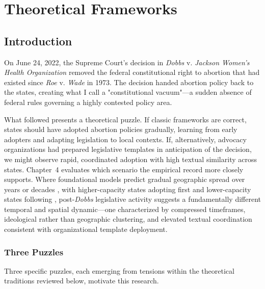 
\chapter{Theoretical Frameworks}
\label{ch:theory}

\section{Introduction}

On June 24, 2022, the Supreme Court's decision in \textit{Dobbs} v. \textit{Jackson Women's Health Organization} removed the federal constitutional right to abortion that had existed since \textit{Roe} v. \textit{Wade} in 1973. The decision handed abortion policy back to the states, creating what I call a "constitutional vacuum"---a sudden absence of federal rules governing a highly contested policy area.

What followed presents a theoretical puzzle. If classic frameworks are correct, states should have adopted abortion policies gradually, learning from early adopters and adapting legislation to local contexts. If, alternatively, advocacy organizations had prepared legislative templates in anticipation of the decision, we might observe rapid, coordinated adoption with high textual similarity across states. Chapter~4 evaluates which scenario the empirical record more closely supports. Where foundational models predict gradual geographic spread over years or decades \parencite{walkerDiffusionInnovationsAmerican1969, berryStateLotteryAdoptions1990}, with higher-capacity states adopting first and lower-capacity states following \parencite{shipanMechanismsPolicyDiffusion2008a}, post-\emph{Dobbs} legislative activity suggests a fundamentally different temporal and spatial dynamic---one characterized by compressed timeframes, ideological rather than geographic clustering, and elevated textual coordination consistent with organizational template deployment.

\subsection{Three Puzzles}

Three specific puzzles, each emerging from tensions within the theoretical traditions reviewed below, motivate this research.


